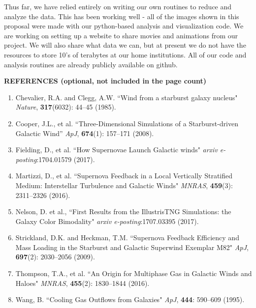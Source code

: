 \documentclass[11pt,letterpaper,english]{article}
\begin{document}
Thus far, we have relied entirely on writing our own routines to reduce and analyze the data. This has been working well - all of the images shown in this proposal were made with our python-based analysis and visualization code. We are working on setting up a website to share movies and animations from our project. We will also share what data we can, but at present we do not have the resources to store 10's of terabytes at our home institutions. All of our code and analysis routines are already publicly available on github.

\vspace{.08in}
\textbf{REFERENCES (optional, not included in the page count)}
\vspace{6pt}


\begin{enumerate}\itemsep0pt
\item Chevalier, R.A. and Clegg, A.W. ``Wind from a starburst galaxy nucleus" \emph{Nature}, \textbf{317}(6032): 44--45 (1985). \\
\item Cooper, J.L., et al. ``Three-Dimensional Simulations of a Starburst-driven Galactic Wind'' \emph{ApJ}, \textbf{674}(1): 157--171 (2008). \\
\item Fielding, D., et al. ``How Supernovae Launch Galactic winds" \emph{arxiv e-posting}:1704.01579 (2017). \\
\item Martizzi, D., et al. ``Supernova Feedback in a Local Vertically Stratified Medium: Interstellar Turbulence and Galactic Winds" \emph{MNRAS}, \textbf{459}(3): 2311--2326 (2016). \\
\item Nelson, D. et al., ``First Results from the IllustrisTNG Simulations: the Galaxy Color Bimodality" \emph{arxiv e-posting}:1707.03395 (2017). \\
\item Strickland, D.K. and Heckman, T.M. ``Supernova Feedback Efficiency and Mass Loading in the Starburst and Galactic Superwind Exemplar M82" \emph{ApJ}, \textbf{697}(2): 2030--2056 (2009). \\
\item Thompson, T.A., et al. ``An Origin for Multiphase Gas in Galactic Winds and Haloes" \emph{MNRAS}, \textbf{455}(2): 1830--1844 (2016). \\
\item Wang, B. ``Cooling Gas Outflows from Galaxies" \emph{ApJ}, \textbf{444}: 590--609 (1995). \\

\end{enumerate}
\end{document}
